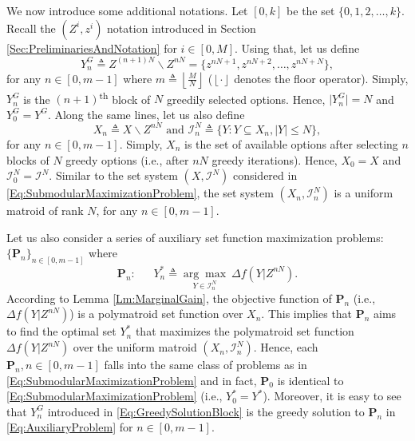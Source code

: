 \documentclass[conference]{IEEEtran}
\begin{document}
We now introduce some additional notations. Let $[0,k]$ be the set $\{0,1,2,\ldots,k\}$. Recall the $(Z^i,z^i)$ notation introduced in Section \ref{Sec:PreliminariesAndNotation} for $i\in [0,M]$. Using that, let us define
\begin{equation}\label{Eq:GreedySolutionBlock}
    Y^G_n \triangleq Z^{(n+1)N} \backslash Z^{nN} = \{z^{nN+1},z^{nN+2},\ldots,z^{nN+N}\}, 
\end{equation}
for any $n\in[0,m-1]$ where $m \triangleq \left \lfloor{\frac{M}{N}}\right \rfloor$ ($\left \lfloor{\cdot}\right \rfloor$ denotes the floor operator). Simply, $Y^G_n$ is the $(n+1)$\textsuperscript{th} block of $N$ greedily selected options. Hence, $\vert Y^G_n \vert = N$ and $Y^G_0 = Y^G$. Along the same lines, let us also define 
\begin{equation}\label{Eq:groundSetBlock}
X_n \triangleq X\backslash Z^{nN} \mbox{ and } \mathcal{I}_n^N \triangleq \{Y:Y \subseteq X_n, \vert Y \vert \leq N\},   
\end{equation}
for any $n\in[0,m-1]$. Simply, $X_n$ is the set of available options after selecting $n$ blocks of $N$ greedy options (i.e., after $nN$ greedy iterations). Hence, $X_0 = X$ and $\mathcal{I}_0^N = \mathcal{I}^N$. Similar to the set system $(X,\mathcal{I}^N)$ considered in \eqref{Eq:SubmodularMaximizationProblem}, the set system $(X_n,\mathcal{I}_n^N)$ is a uniform matroid of rank $N$, for any $n\in[0,m-1]$. 


Let us also consider a series of auxiliary set function maximization problems: $\{\mathbf{P}_n\}_{n\in [0,m-1]}$ where 
\begin{equation}\label{Eq:AuxiliaryProblem}
    \mathbf{P}_n :\ \ \ \ \ \ \ Y^*_n \triangleq \underset{Y\in\mathcal{I}^N_n}{\arg\max}\ \Delta f(Y\vert Z^{nN}).
\end{equation}
According to Lemma \ref{Lm:MarginalGain}, the objective function of $\mathbf{P}_n$ (i.e., $\Delta f(Y\vert Z^{nN})$) is a polymatroid set function over $X_n$. This implies that $\mathbf{P}_n$ aims to find the optimal set $Y^*_n$ that maximizes the polymatroid set function $\Delta f(Y\vert Z^{nN})$ over the uniform matroid $(X_n,\mathcal{I}^N_n)$. Hence, each $\mathbf{P}_n, n\in [0,m-1]$ falls into the same class of problems as in \eqref{Eq:SubmodularMaximizationProblem} and in fact, $\mathbf{P}_0$ is identical to \eqref{Eq:SubmodularMaximizationProblem} (i.e., $Y^*_0 = Y^*$). Moreover, it is easy to see that $Y^G_n$ introduced in \eqref{Eq:GreedySolutionBlock} is the greedy solution to $\mathbf{P}_n$ in \eqref{Eq:AuxiliaryProblem} for $n\in[0,m-1]$.  
\end{document}
